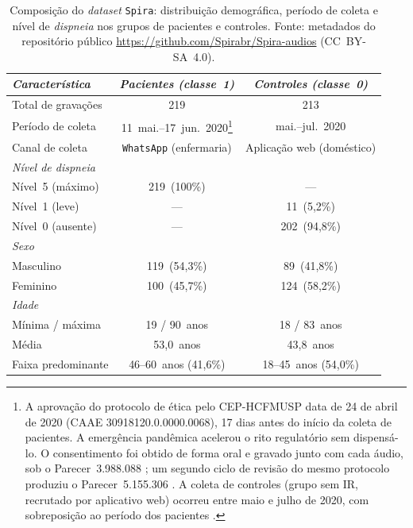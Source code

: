 \begin{table}[!htbp]
\centering
\caption[Composição do dataset Spira: distribuição demográfica, período de coleta e nível de dispneia.]{Composição do \textit{dataset} \texttt{Spira}: distribuição demográfica, período de coleta e nível de \textit{dispneia} nos grupos de pacientes e controles. Fonte: metadados do repositório público \url{https://github.com/Spirabr/Spira-audios} (CC~BY-SA~4.0).}
\label{tab:dataset_Spira}
\small
\begin{tabular}{lcc}
\toprule
\textit{Característica} & \textit{Pacientes (classe~1)} & \textit{Controles (classe~0)} \\
\midrule
Total de gravações & 219 & 213 \\
Período de coleta & 11~mai.--17~jun.~2020\footnote{A aprovação do protocolo de ética pelo CEP-HCFMUSP data de 24 de abril de 2020 (CAAE 30918120.0.0000.0068), 17 dias antes do início da coleta de pacientes. A emergência pandêmica acelerou o rito regulatório sem dispensá-lo. O consentimento foi obtido de forma oral e gravado junto com cada áudio, sob o Parecer~3.988.088 \parencite{Berti2023Frequency}; um segundo ciclo de revisão do mesmo protocolo produziu o Parecer~5.155.306 \parencite{Berti2025Healthcare}. A coleta de controles (grupo sem IR, recrutado por aplicativo web) ocorreu entre maio e julho de 2020, com sobreposição ao período dos pacientes \parencite{Casanova2021DeepLearning}.} & mai.--jul.~2020 \\
Canal de coleta & \texttt{WhatsApp} (enfermaria) & Aplicação web (doméstico) \\
\midrule
\textit{Nível de dispneia} & & \\
\quad Nível~5 (máximo) & 219~(100\%) & --- \\
\quad Nível~1 (leve) & --- & 11~(5,2\%) \\
\quad Nível~0 (ausente) & --- & 202~(94,8\%) \\
\midrule
\textit{Sexo} & & \\
\quad Masculino & 119~(54,3\%) & 89~(41,8\%) \\
\quad Feminino & 100~(45,7\%) & 124~(58,2\%) \\
\midrule
\textit{Idade} & & \\
\quad Mínima / máxima & 19 / 90~anos & 18 / 83~anos \\
\quad Média & 53,0~anos & 43,8~anos \\
\quad Faixa predominante & 46--60~anos (41,6\%) & 18--45~anos (54,0\%) \\
\bottomrule
\end{tabular}
\end{table}

